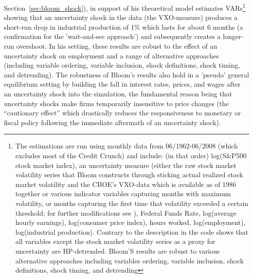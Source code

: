 \documentclass[a4paper,11pt,listof=nochaptergap,oneside,pointednumbers,bibtotoc,bigheadings,liststotoc]{scrbook}
\begin{document}
Section~\ref{sec:bloom_shock}), in support of his theoretical model \citet{bloom:09} estimates VARs\footnote{The estimations are run using monthly data from 06/1962-06/2008 (which excludes most of the Credit Crunch) and include: (in that order) log(S\&P500 stock market index), an uncertainty measure (either the raw stock market volatility series that Bloom constructs through sticking actual realized stock market volatility and the CBOE's VXO-data which is available as of 1986 together or various indicator variables capturing months with maximum volatility, or months capturing the first time that volatility exceeded a certain threshold; for further modifications see \citealp{bloom:09}), Federal Funds Rate, log(average hourly earnings), log(consumer price index), hours worked, log(employment), log(industrial production). Contrary to the description in \citet{bloom:09} the code shows that all variables except the stock market volatility series as a proxy for uncertainty are HP-detrended. Bloom'S results are robust to various alternative approaches including variables ordering, variable inclusion, shock definitions, shock timing, and detrending} showing that an uncertainty shock in the data (the VXO-measure) produces a short-run drop in industrial production of 1\% which lasts for about 6 months (a confirmation for the ’wait-and-see approach’) and subsequently creates a longer-run overshoot. In his setting, these results are robust to the effect of an uncertainty shock on employment and a range of alternative approaches (including variable ordering, variable inclusion, shock definitions, shock timing, and detrending). The robustness of Bloom's results also hold in a 'pseudo' general equilibrium setting by building the fall in interest rates, prices, and wages after an uncertainty shock into the simulation, the fundamental reason being that uncertainty shocks make firms temporarily insensitive to price changes (the ``cautionary effect'' which drastically reduces the responsiveness to monetary or fiscal policy following the immediate aftermath of an uncertainty shock).
\end{document}
